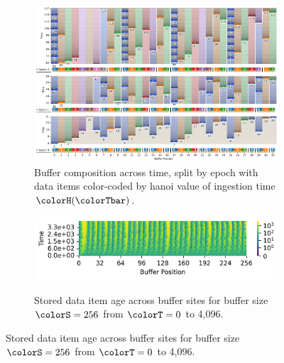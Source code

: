 \begin{figure}[htbp!]
\begin{subfigure}[b]{\linewidth}
\includegraphics[width=\linewidth]{
binder/teeplots/20/num-generations=128+surface-size=32+viz=site-reservation-by-rank-spliced-at-heatmap+ext=}
\vspace{-4.5ex}\caption{
  Buffer composition across time, split by epoch with data items color-coded by hanoi value of ingestion time $\colorH(\colorTbar)$.
}
\label{fig:hsurf-tilted-implementation-schematic}
\end{subfigure}

\vspace{0.5ex}
\begin{minipage}[]{\textwidth}
 \vspace{-2pt}
  \begin{subfigure}[t]{0.65\linewidth}
    \vspace{0pt}
    \centering
  \includegraphics[width=0.88\linewidth,clip]{binder/teeplots/20/cnorm=log+num-generations=4096+surface-size=256+viz=site-ingest-depth-by-rank-heatmap+ynorm=linear+ext=.png}  %
  \end{subfigure}%
  \begin{subfigure}[t]{0.35\linewidth}
  \vspace{-2pt}
  \caption{%
    \footnotesize
    Stored data item age across buffer sites for buffer size $\colorS=256$ from $\colorT=0$ to 4,096.
  }
  \label{fig:hsurf-tilted-implementation-heatmap}
\end{subfigure}
\end{minipage}


\end{figure}
